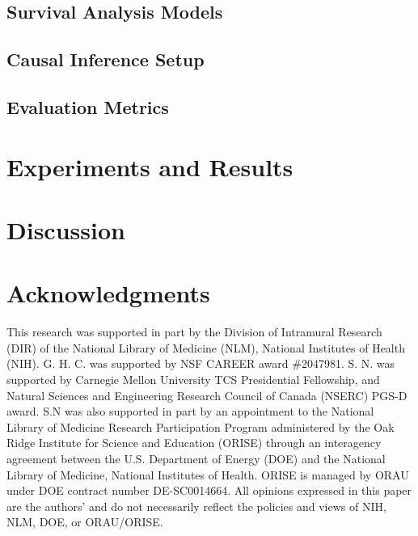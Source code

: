 \documentclass[pmlr,twocolumn,10pt]{jmlr} %
\begin{document}
\subsection{Survival Analysis Models}
\label{sec:methods_survival}


\subsection{Causal Inference Setup}
\label{sec:methods_causal}


\subsection{Evaluation Metrics}
\label{sec:eval_metrics}


\section{Experiments and Results}
\label{sec:experiments_results}


\section{Discussion}
\label{sec:discussion}


\newpage
\section*{Acknowledgments}
\label{sec:acknowledgments}
This research was supported in part by the Division of Intramural Research (DIR) of the National Library of Medicine (NLM), National Institutes of Health (NIH).
G. H. C. was supported by NSF CAREER award \#2047981.
S. N. was supported by Carnegie Mellon University TCS Presidential Fellowship, and Natural Sciences and Engineering Research Council of Canada (NSERC) PGS-D award.
S.N was also supported in part by an appointment to the National Library of Medicine Research Participation Program administered by the Oak Ridge Institute for Science and Education (ORISE) through an interagency agreement between the U.S. Department of Energy (DOE) and the National Library of Medicine, National Institutes of Health. 
ORISE is managed by ORAU under DOE contract number DE-SC0014664. 
All opinions expressed in this paper are the authors' and do not necessarily reflect the policies and views of NIH, NLM,
DOE, or ORAU/ORISE.
\end{document}
